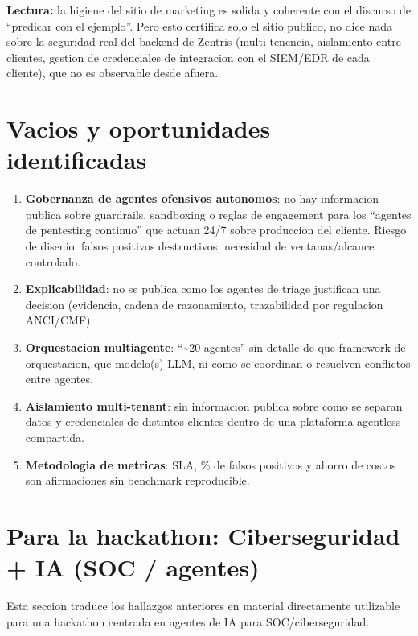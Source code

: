 \documentclass[11pt,a4paper]{article}
\begin{document}
\textbf{Lectura:} la higiene del sitio de marketing es solida y coherente con el discurso de
``predicar con el ejemplo''. Pero esto certifica solo el sitio publico, no dice nada sobre la
seguridad real del backend de Zentris (multi-tenencia, aislamiento entre clientes, gestion de
credenciales de integracion con el SIEM/EDR de cada cliente), que no es observable desde afuera.

\section{Vacios y oportunidades identificadas}

\begin{enumerate}[leftmargin=1.4em]
  \item \textbf{Gobernanza de agentes ofensivos autonomos}: no hay informacion publica sobre
  guardrails, sandboxing o reglas de engagement para los ``agentes de pentesting continuo''
  que actuan 24/7 sobre produccion del cliente. Riesgo de disenio: falsos positivos destructivos,
  necesidad de ventanas/alcance controlado.
  \item \textbf{Explicabilidad}: no se publica como los agentes de triage justifican una
  decision (evidencia, cadena de razonamiento, trazabilidad por regulacion ANCI/CMF).
  \item \textbf{Orquestacion multiagente}: ``\textasciitilde 20 agentes'' sin detalle de que
  framework de orquestacion, que modelo(s) LLM, ni como se coordinan o resuelven conflictos
  entre agentes.
  \item \textbf{Aislamiento multi-tenant}: sin informacion publica sobre como se separan datos
  y credenciales de distintos clientes dentro de una plataforma agentless compartida.
  \item \textbf{Metodologia de metricas}: SLA, \% de falsos positivos y ahorro de costos son
  afirmaciones sin benchmark reproducible.
\end{enumerate}

\section{\color{brandblue} Para la hackathon: Ciberseguridad + IA (SOC / agentes)}

Esta seccion traduce los hallazgos anteriores en material directamente utilizable para una
hackathon centrada en agentes de IA para SOC/ciberseguridad.
\end{document}
